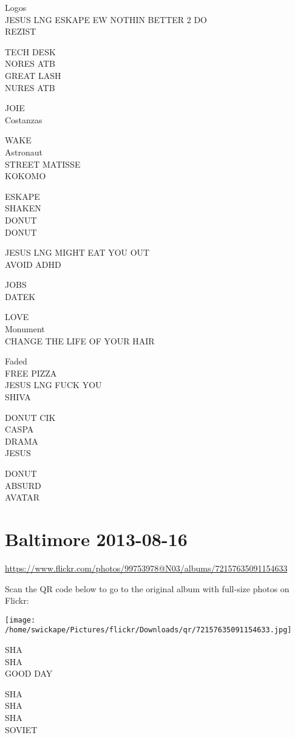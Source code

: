 \documentclass[10pt,letterpaper]{article}
\begin{document}
Logos\\
JESUS LNG ESKAPE EW NOTHIN BETTER 2 DO\\
REZIST

TECH DESK\\
NORES ATB\\
GREAT LASH\\
NURES ATB

JOIE\\
Costanzas

WAKE\\
Astronaut\\
STREET MATISSE\\
KOKOMO

ESKAPE\\
SHAKEN\\
DONUT\\
DONUT

JESUS LNG MIGHT EAT YOU OUT\\
AVOID ADHD

JOBS\\
DATEK

LOVE\\
Monument\\
CHANGE THE LIFE OF YOUR HAIR

Faded\\
FREE PIZZA\\
JESUS LNG FUCK YOU\\
SHIVA

DONUT CIK\\
CASPA\\
DRAMA\\
JESUS

DONUT\\
ABSURD\\
AVATAR
\pagebreak

\section*{Baltimore 2013-08-16}

\url{https://www.flickr.com/photos/99753978@N03/albums/72157635091154633}

Scan the QR code below to go to the original album with full-size photos on Flickr:

\texttt{[image: /home/swickape/Pictures/flickr/Downloads/qr/72157635091154633.jpg]}
\pagebreak

SHA\\
SHA\\
GOOD DAY

SHA\\
SHA\\
SHA\\
SOVIET
\end{document}
